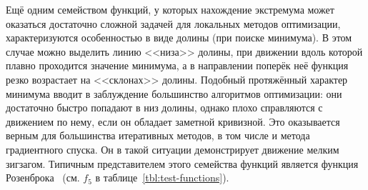 Ещё одним семейством функций, у которых нахождение экстремума может
оказаться достаточно сложной задачей для локальных методов
оптимизации, характеризуются особенностью в виде долины (при поиске
минимума). В этом случае можно выделить линию <<низа>> долины, при
движении вдоль которой плавно проходится значение минимума, а
в направлении поперёк неё функция резко возрастает на <<склонах>>
долины. Подобный протяжённый характер минимума вводит в заблуждение
большинство алгоритмов оптимизации: они достаточно быстро попадают в
низ долины, однако плохо справляются с движением по нему, если он
обладает заметной кривизной. Это оказывается верным для
большинства итеративных методов, в том числе и метода градиентного
спуска. Он в такой ситуации демонстрирует движение мелким
зигзагом. Типичным представителем этого семейства функций является
функция Розенброка~\cite{Rosenbrock-1960}
(см. $f_5$ в таблице~\ref{tbl:test-functions}).
\begingroup %
\renewcommand{\arraystretch}{1.6}%
